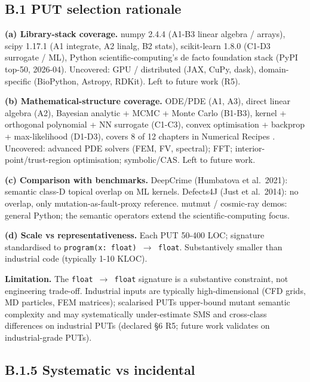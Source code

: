 \documentclass[acmsmall,screen,review]{acmart}
\begin{document}
\subsection{B.1 PUT selection rationale}\label{b.1-put-selection-rationale-detailed-coverage-argument}

\textbf{(a) Library-stack coverage.} numpy 2.4.4 (A1-B3 linear algebra /
arrays), scipy 1.17.1 (A1 integrate, A2 linalg, B2 stats), scikit-learn
1.8.0 (C1-D3 surrogate / ML), Python scientific-computing's de facto
foundation stack (PyPI top-50, 2026-04). Uncovered: GPU / distributed
(JAX, CuPy, dask), domain-specific (BioPython, Astropy, RDKit). Left to
future work (R5).

\textbf{(b) Mathematical-structure coverage.} ODE/PDE (A1, A3), direct
linear algebra (A2), Bayesian analytic + MCMC + Monte Carlo (B1-B3),
kernel + orthogonal polynomial + NN surrogate (C1-C3), convex
optimisation + backprop + max-likelihood (D1-D3), covers 8 of 12
chapters in Numerical Recipes \citep{press2007numerical}. Uncovered: advanced
PDE solvers (FEM, FV, spectral); FFT; interior-point/trust-region
optimisation; symbolic/CAS. Left to future work.

\textbf{(c) Comparison with benchmarks.} DeepCrime (Humbatova et
al.~2021): semantic class-D topical overlap on ML kernels. Defects4J (Just et
al.~2014): no overlap, only mutation-as-fault-proxy reference. mutmut /
cosmic-ray demos: general Python; the semantic operators extend the scientific-computing focus.

\textbf{(d) Scale vs representativeness.} Each PUT 50-400 LOC; signature
standardised to \texttt{program(x:\ float)\ $\to$\ float}. Substantively
smaller than industrial code (typically 1-10 KLOC).

\textbf{Limitation.} The \texttt{float\ $\to$\ float} signature is a
substantive constraint, not engineering trade-off. Industrial inputs are
typically high-dimensional (CFD grids, MD particles, FEM matrices);
scalarised PUTs upper-bound mutant semantic complexity and may
systematically under-estimate SMS and cross-class differences on
industrial PUTs (declared §6 R5; future work validates on industrial-grade PUTs).

\subsection{B.1.5 Systematic vs incidental}\label{b.1.5-systematic-vs-incidental}
\end{document}
